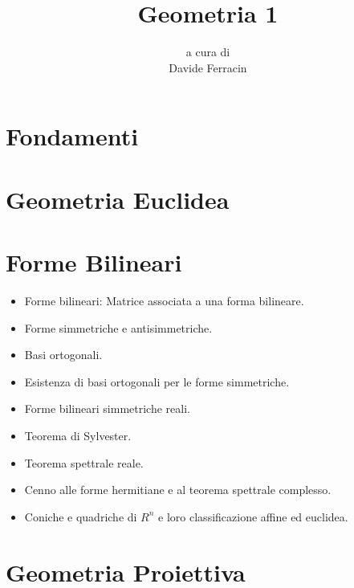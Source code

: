 \documentclass[a4paper]{book}
\title{
	{\sffamily\fontsize{35}{42}\selectfont Geometria 1}
}
\author{
	{\small a cura di}\\
	Davide Ferracin
}
\date{}
\begin{document}
\frontmatter
\maketitle
\tableofcontents

\mainmatter
\chapter{Fondamenti}
	


\chapter{Geometria Euclidea}

		
	
	
	
	   
	
	
	
	
	
	
	
	
	
	
	


\chapter{Forme Bilineari}
\begin{itemize}
	\item Forme bilineari: Matrice associata a una forma bilineare. 
	\item Forme simmetriche e antisimmetriche. 
	\item Basi ortogonali. 
	\item Esistenza di basi ortogonali per le forme simmetriche. 
	\item Forme bilineari simmetriche reali. 
	\item Teorema di Sylvester. 
	\item Teorema spettrale reale. 
	\item Cenno alle forme hermitiane e al teorema spettrale complesso.  
	\item Coniche e quadriche di $R^n$ e loro classificazione affine ed euclidea.
\end{itemize}

\chapter{Geometria Proiettiva}
\end{document}
